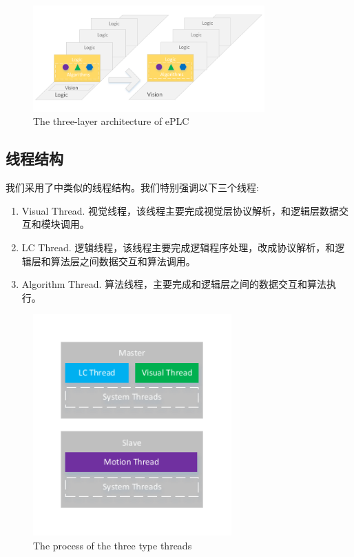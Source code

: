 \documentclass[journal,UTF8]{IEEEtran}
\begin{document}
\begin{figure}
	\centering
	\includegraphics[width=3.5in]{fig/Software.pdf}
	\caption{The three-layer architecture of ePLC}
	\label{fig:Software}
\end{figure}



\subsection{线程结构}
我们采用了\cite{Wua}中类似的线程结构。我们特别强调以下三个线程:
\begin{enumerate}
	\item Visual Thread. 视觉线程，该线程主要完成视觉层协议解析，和逻辑层数据交互和模块调用。
	\item LC Thread. 逻辑线程，该线程主要完成逻辑程序处理，改成协议解析，和逻辑层和算法层之间数据交互和算法调用。
	\item Algorithm Thread. 算法线程，主要完成和逻辑层之间的数据交互和算法执行。
\end{enumerate}



\begin{figure}
	\centering
	\includegraphics[width=3in]{fig/Threads.pdf}
	\caption{ The process of the three type threads}
	\label{fig:Threads}
\end{figure}
\end{document}
